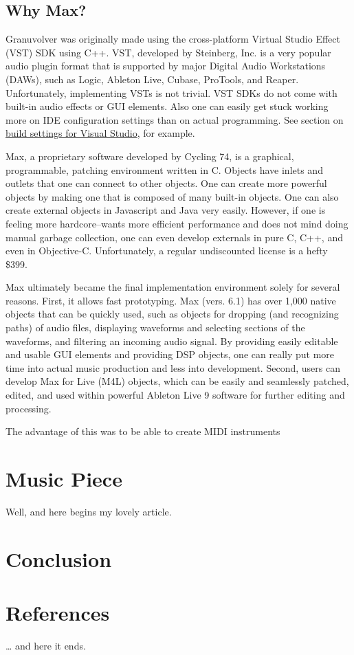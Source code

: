 \documentclass{article}
\begin{document}
		\subsection{Why Max?}
		Granuvolver was originally made using the cross-platform Virtual Studio Effect (VST) SDK using C++. VST, developed by Steinberg, Inc. is a very popular audio plugin format that is supported by major Digital Audio Workstations (DAWs), such as Logic, Ableton Live, Cubase, ProTools, and Reaper.  Unfortunately, implementing VSTs is not trivial. VST SDKs do not come with built-in audio effects or GUI elements. Also one can easily get stuck working more on IDE configuration settings than on actual programming. See section on  \href{http://teragonaudio.com/article/How-to-make-VST-plugins-in-Visual-Studio.html}{build settings for Visual Studio}, for example.

		Max, a proprietary software developed by Cycling 74, is a graphical, programmable, patching environment written in C.  Objects have inlets and outlets that one can connect to other objects. One can create more powerful objects by making one that is composed of many built-in objects. One can also create external objects in Javascript and Java very easily. However, if one is feeling more hardcore--wants more efficient performance and does not mind doing manual garbage collection, one can even develop externals in pure C, C++, and even in Objective-C. Unfortunately, a regular undiscounted license is a hefty \$399.

		Max ultimately became the final implementation environment solely for several reasons. First, it allows fast prototyping. Max (vers. 6.1) has over 1,000 native objects that can be quickly used, such as objects for dropping (and recognizing paths) of audio files, displaying waveforms and selecting sections of the waveforms, and filtering an incoming audio signal. By providing easily editable and usable GUI elements and providing DSP objects, one can really put more time into actual music production and less into development. Second, users can develop Max for Live (M4L) objects, which can be easily and seamlessly patched, edited, and used within powerful Ableton Live 9 software for further editing and processing.



	The advantage of this was to be able to create MIDI instruments 
	\section{Music Piece}
	Well, and here begins my lovely article.
	\section{Conclusion}
	\section{References}
	\ldots{} and here it ends.
\end{document}
